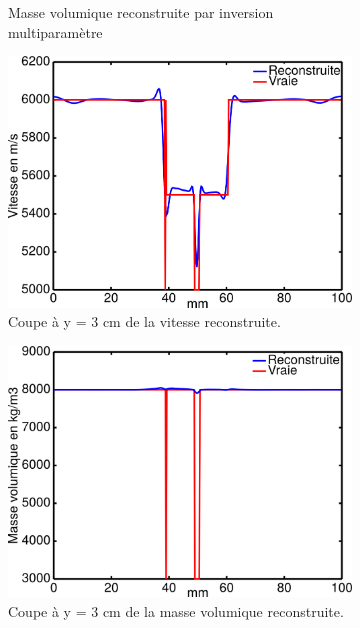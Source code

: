\documentclass[a4paper,11pt]{report} %
\newenvironment{changemargin}[2]{\begin{list}{}{%
\setlength{\topsep}{0pt}%
\setlength{\leftmargin}{0pt}%
\setlength{\rightmargin}{0pt}%
\setlength{\listparindent}{\parindent}%
\setlength{\itemindent}{\parindent}%
\setlength{\parsep}{0pt plus 1pt}%
\addtolength{\leftmargin}{#1}%
\addtolength{\rightmargin}{#2}%
\setlength{\textwidth}{21cm}
}\item }{\end{list}}
\begin{document}
\begin{figure}[!h]
\begin{changemargin}{-2cm}{-2cm}
\begin{subfigure}[b]{0.3\textwidth}
    	\caption{Masse volumique reconstruite par inversion multiparamètre}
    \end{subfigure}
    
    \begin{subfigure}[b]{0.3\textwidth}
    	\includegraphics[width=\textwidth]{img/coupe_vp_InitEcrete.png}
    	\caption{Coupe à y = 3 cm de la vitesse reconstruite.}
    \end{subfigure}
    \begin{subfigure}[b]{0.3\textwidth}
    	\includegraphics[width=\textwidth]{img/coupe_rho_InitEcrete.png}
    	\caption{Coupe à y = 3 cm de la masse volumique reconstruite.}
    \end{subfigure}
\end{changemargin}
	\caption{\label{res_ecrete}}
\end{figure}
\end{document}
